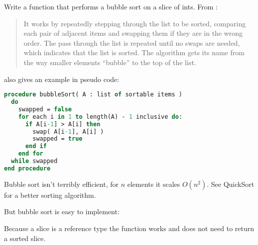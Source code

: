 \begin{Exercise}[title={Bubble sort},difficulty=1]
\label{ex:bubble}
\Question\label{ex:bubble q1} Write a function that performs 
a bubble sort on a slice of ints. From \cite{bubblesort}:
\begin{quote}
It works by repeatedly stepping through the list to be sorted, comparing each
pair of adjacent items and swapping them if they are in the wrong order. The
pass through the list is repeated until no swaps are needed, which indicates
that the list is sorted. The algorithm gets its name from the way smaller
elements ``bubble'' to the top of the list. 
\end{quote}

\cite{bubblesort} also gives an example in pseudo code:
\begin{lstlisting}[language=pascal]
procedure bubbleSort( A : list of sortable items )
  do
    swapped = false
    for each i in 1 to length(A) - 1 inclusive do:
      if A[i-1] > A[i] then
        swap( A[i-1], A[i] )
        swapped = true
      end if
    end for
  while swapped
end procedure
\end{lstlisting}
\end{Exercise}

\begin{Answer}
\Question 
Bubble sort isn't terribly efficient, for $n$ elements it scales
$O(n^2)$. See QuickSort \cite{quicksort} for a better sorting algorithm.

But bubble sort is easy to implement:


Because a slice is a reference type the  function works and
does not need to return a sorted slice.
\end{Answer}
